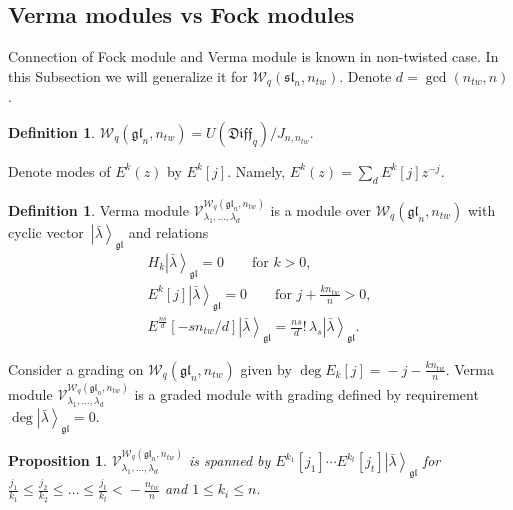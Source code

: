 \documentclass[pdftex]{sigma}
\numberwithin{equation}{section}
\newtheorem{Proposition}[Theorem]{Proposition}
\theoremstyle{definition}
\newtheorem{Definition}[Theorem]{Definition}
\newcommand{\qD}{\mathfrak{Diff}_q}
\newcommand{ \twW }{ \mathcal{W}_{q} ( \mathfrak{sl}_n, n_{tw} ) }
\newcommand{ \twWgl }{ \mathcal{W}_{q} ( \mathfrak{gl}_n, n_{tw} ) }
\newcommand{\Vergl}{\mathcal{V}^{\twWgl}_{\lambda_1, \dots, \lambda_d} }
\newcommand{\vacgl}{\left|\bar{\lambda} \right\rangle_{\mathfrak{gl}} }
\newcommand{\fact}{\frac{ns}{d}! \,}
\begin{document}
\subsection{Verma modules vs Fock modules} \label{Connection with Verma module}

Connection of Fock module and Verma module is known in non-twisted case. In this Subsection we will generalize it for $\twW$. Denote $d= \gcd(n_{tw},n)$.

\begin{Definition}
$\twWgl = U(\qD)/J_{n,n_{tw}}$.
\end{Definition}

Denote modes of $E^k(z)$ by $E^k[j]$. Namely, $E^k(z) = \sum_d E^k[j] z^{-j}$.

\begin{Definition} \label{definition: Verma}
Verma module $\Vergl$ is a module over $\twWgl$ with cyclic vector~$\vacgl$ and relations
\begin{gather*}
H_k \vacgl =0 \qquad \text{for $k>0$}, \\
E^k[j] \vacgl =0 \qquad \text{for $j+\frac{kn_{tw}}{n}>0$}, \\
E^{\frac{ns}{d}}[-sn_{tw}/d] \vacgl = \fact \lambda_s \vacgl .
\end{gather*}
\end{Definition}

Consider a grading on $\twWgl$ given by $\deg E_k[j] \!=\! -j-\frac{k n_{tw}}{n}$. Verma module $\Vergl$ is a graded module with grading defined by requirement $\deg \vacgl = 0$.

\begin{Proposition} \label{prop: cyclic Verma}
$\Vergl$ is spanned by $E^{k_1}[j_1] \cdots E^{k_t}[j_t] \vacgl$ for $\frac{j_1}{k_1} \leqslant \frac{j_2}{k_2} \leqslant \dots \leqslant \frac{j_t}{k_t} <\!{-}\frac{n_{tw}}{n}$ and $1 \leqslant k_i \leqslant n$.
\end{Proposition}
\end{document}
